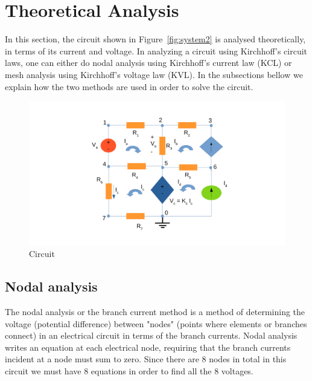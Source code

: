 \section{Theoretical Analysis}
\label{sec:analysis}

In this section, the circuit shown in Figure~\ref{fig:system2} is analysed
theoretically, in terms of its current and voltage.
In analyzing a circuit using Kirchhoff's circuit laws, one can either do nodal analysis using Kirchhoff's current law (KCL) or mesh analysis using Kirchhoff's voltage law (KVL).
In the subsections bellow we explain how the two methods are used in order to solve the circuit. 

\begin{figure}[ht]
\centering
\includegraphics[width = 15cm]{system2.pdf}
\caption {Circuit}
\end{figure}



\subsection{Nodal analysis}
The nodal analysis or the branch current method is a method of determining the voltage (potential difference) between "nodes" (points where elements or branches connect) in an electrical circuit in terms of the branch currents. 
Nodal analysis writes an equation at each electrical node, requiring that the branch currents incident at a node must sum to zero.
Since there are 8 nodes in total in this circuit we must have 8 equations in order to find all the 8 voltages.



